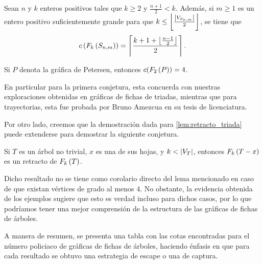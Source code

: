 \begin{conjetura}
    Sean $n$ y $k$ enteros positivos tales que $k\geq 2$ y $\frac{n+1}{2}<k$.
    Adem\'as, si $m\geq1$ es un entero positivo suficientemente grande para que
    $k\leq \left\lfloor\frac{\left|V_{S_{n,m}}\right|}{2}\right\rfloor$, se tiene que
    \[
        c\left( F_{k}\left( S_{n,m}\right)\right) = \left\lceil \frac{k + 1 + \left \lfloor \frac{n-1}{2}
        \right \rfloor}{2} \right \rceil.
    \]
\end{conjetura}

\begin{conjetura}
    Si $P$ denota la gr\'afica de Petersen, entonces $c(F_{2}\left( P\right))=4$.
\end{conjetura}

En particular para la primera conjetura, esta concuerda con nuestras
exploraciones obtenidas en gr\'aficas de fichas de triadas, mientras que para
trayectorias, esta fue probada por Bruno Amezcua en su tesis de licenciatura.

Por otro lado, creemos que la demostraci\'on dada para
\cref{lem:retracto_triada}
puede extenderse para demostrar la siguiente conjetura.

\begin{conjetura}
    Si $T$ es un \'arbol no trivial, $x$ es una de sus hojas, y $k<\left|V_T\right|$,
    entonces $F_{k}\left( T-x\right)$ es un retracto de $F_{k}\left( T\right)$.
\end{conjetura}

Dicho resultado no se tiene como corolario directo del lema mencionado en caso
de que existan v\'ertices de grado al menos $4$. No obstante, la evidencia
obtenida de los ejemplos sugiere que esto es verdad incluso para dichos casos,
por lo que podr\'iamos tener una mejor comprensi\'on de la estructura de las
gr\'aficas de fichas de \'arboles.

A manera de resumen, se presenta una tabla con las cotas encontradas para el
n\'umero policiaco de gr\'aficas de fichas de \'arboles, haciendo \'enfasis en
que para cada resultado se obtuvo una estrategia de escape o una de captura.

